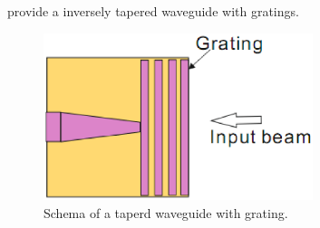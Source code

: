\cite{fiber_to_chip_grating_waveguides} provide a inversely tapered waveguide with gratings.
\begin{figure}[!ht]
\centering
\includegraphics[width=0.7\textwidth]{bilder/tapered_waveguide_grating}
\caption{Schema of a taperd waveguide with grating.}
\label{fig:tapered_waveguide_grating}
\end{figure}

